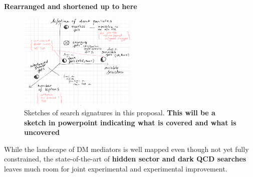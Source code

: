 \color{red}\textbf{Rearranged and shortened up to here}\color{black}

\begin{figure} 
\begin{center}
\includegraphics[width=0.5\textwidth]{figs_B2/darksectorsketch.png}
\caption{Sketches of search signatures in this proposal. \color{red}\textbf{This will be a sketch in powerpoint indicating what is covered and what is uncovered}\color{black}\label{fig:darksectorssketch} }
\vskip2pt
\end{center}
\end{figure}
\vskip5pt

 
While the landscape of DM mediators is well mapped even though not yet fully constrained, 
the state-of-the-art of \textbf{hidden sector and dark QCD searches} leaves much room for joint experimental and experimental improvement.

